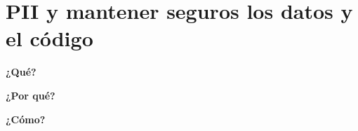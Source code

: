 \documentclass[11pt,en]{elegantpaper}
\begin{document}
\section{PII y mantener seguros los datos y el código}
\textbf{¿Qué?}


\textbf{¿Por qué?}


\textbf{¿Cómo?} 

\end{document}
